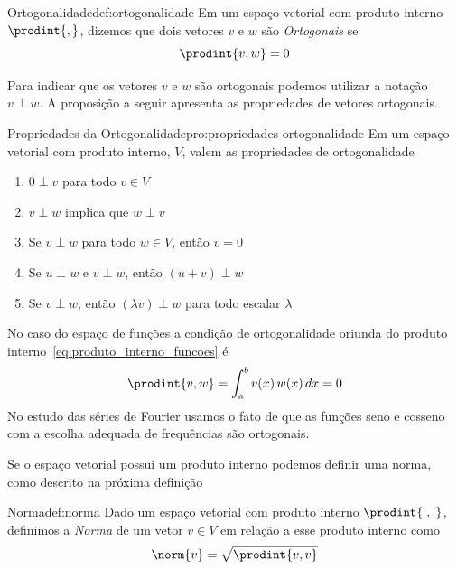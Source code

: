 \begin{definicao}{Ortogonalidade}{def:ortogonalidade}
  Em um espaço vetorial com produto interno $\prodint{,}$, dizemos
  que dois vetores $v$ e $w$ são \emph{Ortogonais} se
  \[
    \prodint{v, w} = 0
  \]
\end{definicao}

Para indicar que os vetores $v$ e $w$ são ortogonais podemos utilizar a notação
\(v\perp w\). A proposição a seguir apresenta as propriedades de vetores
ortogonais.

\begin{proposicao}{Propriedades da Ortogonalidade}{pro:propriedades-ortogonalidade}
  Em um espaço vetorial com produto interno, $V$, valem as propriedades de ortogonalidade
  \begin{enumerate}
    \item \( 0 \perp v \) para todo \(v\in V\)
    \item \( v \perp w \) implica que \( w \perp v \)
    \item Se \( v \perp w \) para todo \(w\in V\), então \(v=0\)
    \item Se \( u \perp w \) e \( v \perp w \), então  \( (u+v) \perp w \)
    \item Se \( v \perp w \), então \( (\lambda v) \perp w \) para todo escalar $\lambda$
  \end{enumerate}
\end{proposicao}

No caso do espaço de funções a condição de ortogonalidade oriunda do produto
interno~\eqref{eq:produto_interno_funcoes} é
\[
  \prodint{v, w} = \int_a^b v(x) \, w(x) \, dx = 0
\]
No estudo das séries de Fourier usamos o fato de que as funções seno e
cosseno com a escolha adequada de frequências são ortogonais.

Se o espaço vetorial possui um produto interno podemos definir uma norma,
como descrito na próxima definição

\begin{definicao}{Norma}{def:norma}
  Dado um espaço vetorial com produto interno \(\prodint{\;,\;}\), definimos a
  \emph{Norma} de um vetor $v\in V$ em relação a esse produto interno
  como
  \[
    \norm{v} = \sqrt{\prodint{v, v}}
  \]
\end{definicao}

